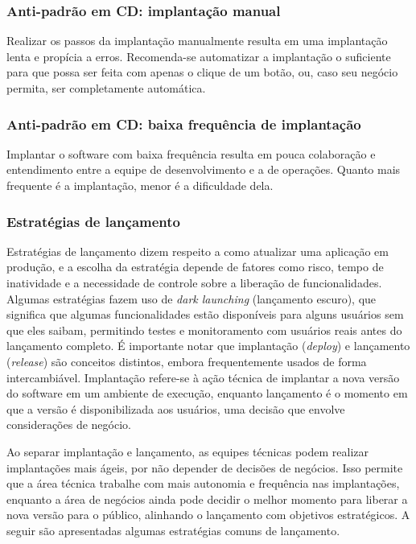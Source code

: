 \subsubsection*{Anti-padrão em CD: implantação manual}
Realizar os passos da implantação manualmente resulta em uma implantação lenta e propícia a erros. Recomenda-se automatizar a implantação o suficiente para que possa ser feita com apenas o clique de um botão, ou, caso seu negócio permita, ser completamente automática. \cite{continuous-delivery-jez-humble}

\subsubsection*{Anti-padrão em CD: baixa frequência de implantação}
Implantar o software com baixa frequência resulta em pouca colaboração e entendimento entre a equipe de desenvolvimento e a de operações. Quanto mais frequente é a implantação, menor é a dificuldade dela. \cite{continuous-delivery-jez-humble, martin-fowler-frequency}

\subsubsection{Estratégias de lançamento}\label{estrategias-implantacao}
Estratégias de lançamento dizem respeito a como atualizar uma aplicação em produção, e a escolha da estratégia depende de fatores como risco, tempo de inatividade e a necessidade de controle sobre a liberação de funcionalidades. Algumas estratégias fazem uso de \emph{dark launching} (lançamento escuro), que significa que algumas funcionalidades estão disponíveis para alguns usuários sem que eles saibam, permitindo testes e monitoramento com usuários reais antes do lançamento completo. É importante notar que implantação (\emph{deploy}) e lançamento (\emph{release}) são conceitos distintos, embora frequentemente usados de forma intercambiável. Implantação refere-se à ação técnica de implantar a nova versão do software em um ambiente de execução, enquanto lançamento é o momento em que a versão é disponibilizada aos usuários, uma decisão que envolve considerações de negócio.

Ao separar implantação e lançamento, as equipes técnicas podem realizar implantações mais ágeis, por não depender de decisões de negócios. Isso permite que a área técnica trabalhe com mais autonomia e frequência nas implantações, enquanto a área de negócios ainda pode decidir o melhor momento para liberar a nova versão para o público, alinhando o lançamento com objetivos estratégicos. A seguir são apresentadas algumas estratégias comuns de lançamento.

